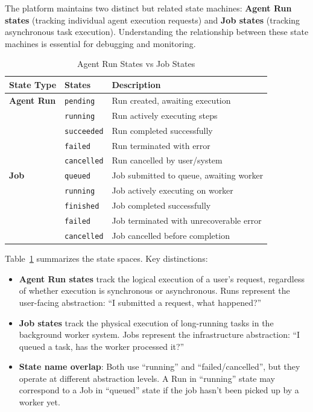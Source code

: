 \documentclass[a4paper,twoside]{sapthesis}
\begin{document}
The platform maintains two distinct but related state machines: \textbf{Agent Run states} (tracking individual agent execution requests) and \textbf{Job states} (tracking asynchronous task execution). Understanding the relationship between these state machines is essential for debugging and monitoring.

\begin{table}[ht]
\centering
\caption{Agent Run States vs Job States}
\label{tab:run-vs-job-states}
\small
\begin{tabular}{lll}
    \hline
    \textbf{State Type} & \textbf{States} & \textbf{Description} \\
    \hline
    \textbf{Agent Run} & \texttt{pending} & Run created, awaiting execution \\
    & \texttt{running} & Run actively executing steps \\
    & \texttt{succeeded} & Run completed successfully \\
    & \texttt{failed} & Run terminated with error \\
    & \texttt{cancelled} & Run cancelled by user/system \\
    \hline
    \textbf{Job} & \texttt{queued} & Job submitted to queue, awaiting worker \\
    & \texttt{running} & Job actively executing on worker \\
    & \texttt{finished} & Job completed successfully \\
    & \texttt{failed} & Job terminated with unrecoverable error \\
    & \texttt{cancelled} & Job cancelled before completion \\
    \hline
\end{tabular}
\end{table}

Table~\ref{tab:run-vs-job-states} summarizes the state spaces. Key distinctions:

\begin{itemize}
    \item \textbf{Agent Run states} track the logical execution of a user's request, regardless of whether execution is synchronous or asynchronous. Runs represent the user-facing abstraction: ``I submitted a request, what happened?''
    
    \item \textbf{Job states} track the physical execution of long-running tasks in the background worker system. Jobs represent the infrastructure abstraction: ``I queued a task, has the worker processed it?''
    
    \item \textbf{State name overlap}: Both use ``running'' and ``failed/cancelled'', but they operate at different abstraction levels. A Run in ``running'' state may correspond to a Job in ``queued'' state if the job hasn't been picked up by a worker yet.
\end{itemize}
\end{document}

